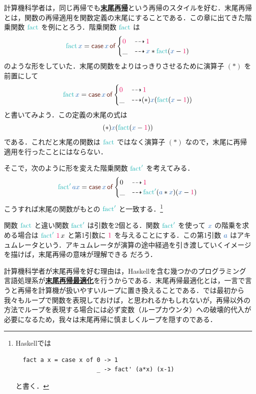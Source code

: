 \documentclass[a5paper,twoside,fleqn,draft]{jsbook}
\def\constantColor{WildStrawberry}
\def\keywordColor{Sepia}
\def\varColor{NavyBlue}
\def\funcColor{BlueGreen}
\newcommand{\programminglanguage}[1]{\textsf{#1}}
\newcommand{\haskell}{\programminglanguage{Haskell}}
\newcommand{\keyword}[1]{{\underline{\textbf{#1}}}}
\newcommand{\mKeyword}[1]{\textcolor{\keywordColor}{\mathsf{#1}}}
\newcommand{\mCaseKeyword}{\mKeyword{case}}
\newcommand{\mOfKeyword}{\mKeyword{of}}
\DeclareMathOperator{\mCaseKW}{\mCaseKeyword}
\DeclareMathOperator{\mOfKW}{\mOfKeyword}
\newcommand{\mConstant}[1]{\textcolor{\constantColor}{#1}}
\newcommand{\mZeroNumber}{{\mConstant{0}}}
\newcommand{\mOneNumber}{{\mConstant{1}}}
\newcommand{\mVar}[1]{\textcolor{\varColor}{#1}}
\newcommand{\mAVar}{{\mVar{a}}}
\newcommand{\mXVar}{\mVar{x}}
\newcommand{\mSpecialFunc}[1]{\textcolor{\funcColor}{\textrm{#1}}}
\newcommand{\mSpecialSpecialFunc}[1]{\textcolor{\funcColor}{\textrm{#1}^\prime}}
\DeclareMathOperator{\mFact}{\mSpecialFunc{fact}}
\DeclareMathOperator{\mFFact}{\mSpecialSpecialFunc{fact}}
\DeclareMathOperator{\mIfSo}{\dashrightarrow}
\newcommand{\mCaseOf}[1]{\mCaseKW#1\mOfKW}
\begin{document}
計算機科学者は，同じ再帰でも\keyword{末尾再帰}という再帰のスタイルを好む．末尾再帰とは，関数の再帰適用を関数定義の末尾にすることである．この章に出てきた階乗関数 $\mFact$ を例にとろう．階乗関数 $\mFact$ は
\begin{equation}
  \mFact\mXVar
  =\mCaseOf{\mXVar}\begin{cases}
    \mZeroNumber
    &\mIfSo\mOneNumber\\
    \_
    &\mIfSo\mXVar*\mFact(\mXVar-\mOneNumber)
  \end{cases}
\end{equation}
のような形をしていた．末尾の関数をよりはっきりさせるために演算子 $(*)$ を前置にして
\begin{equation}
  \mFact\mXVar
  =\mCaseOf{\mXVar}
  \begin{cases}
    \mZeroNumber
    &\mIfSo\mOneNumber\\
    \_
    &\mIfSo(*)\mXVar(\mFact(\mXVar-\mOneNumber))
  \end{cases}
\end{equation}
と書いてみよう．この定義の末尾の式は
\begin{equation}
  (*)\mXVar(\mFact(\mXVar-\mOneNumber))
\end{equation}
である．これだと末尾の関数は $\mFact$ ではなく演算子 $(*)$ なので，末尾に再帰適用を行ったことにはならない．

そこで，次のように形を変えた階乗関数 $\mFFact$ を考えてみる．
\begin{equation}
  \mFFact\mAVar\mXVar
  =\mCaseOf{\mXVar}
  \begin{cases}
    0
    &\mIfSo\mOneNumber\\
    \_
    &\mIfSo\mFFact(\mAVar*\mXVar)(\mXVar-\mOneNumber)
  \end{cases}
\end{equation}
こうすれば末尾の関数がもとの $\mFFact$ と一致する．\footnote{\haskell では
\begin{verbatim}
  fact a x = case x of 0 -> 1
                       _ -> fact' (a*x) (x-1)
\end{verbatim}
と書く．}

関数 $\mFact$ と違い関数 $\mFFact$ は引数を2個とる．関数 $\mFFact$ を使って $\mXVar$ の階乗を求める場合は $\mFFact\,\mOneNumber\,x$ と第1引数に $\mOneNumber$ を与えることにする．この第1引数 $\mAVar$ はアキュムレータという．アキュムレータが演算の途中経過を引き渡していくイメージを描けば，末尾再帰の意味が理解できる
だろう．

計算機科学者が末尾再帰を好む理由は，\haskell を含む幾つかのプログラミング言語処理系が\keyword{末尾再帰最適化}を行うからである．末尾再帰最適化とは，一言で言うと再帰を計算機が扱いやすいループに置き換えることである．では最初から我々もループで関数を表現しておけば，と思われるかもしれないが，再帰以外の方法でループを表現する場合には必ず変数（ループカウンタ）への破壊的代入が必要になるため，我々は末尾再帰に慎ましくループを隠すのである．
\end{document}
